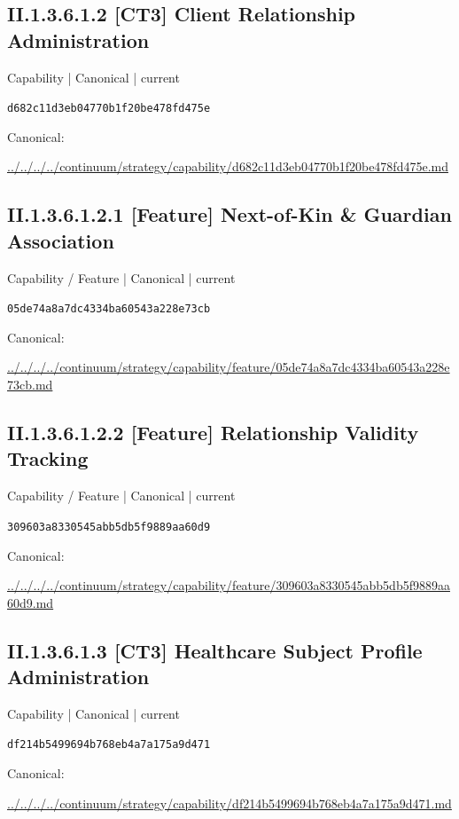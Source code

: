 \documentclass[10pt,a4paper]{article}
\begin{document}
\subsection*{II.1.3.6.1.2 [CT3] Client Relationship Administration}
{\small Capability | Canonical | current}\par
\texttt{d682c11d3eb04770b1f20be478fd475e}\par
Canonical: \par
{\footnotesize\url{../../../../continuum/strategy/capability/d682c11d3eb04770b1f20be478fd475e.md}}\par
\subsection*{II.1.3.6.1.2.1 [Feature] Next-of-Kin \& Guardian Association}
{\small Capability / Feature | Canonical | current}\par
\texttt{05de74a8a7dc4334ba60543a228e73cb}\par
Canonical: \par
{\footnotesize\url{../../../../continuum/strategy/capability/feature/05de74a8a7dc4334ba60543a228e73cb.md}}\par
\subsection*{II.1.3.6.1.2.2 [Feature] Relationship Validity Tracking}
{\small Capability / Feature | Canonical | current}\par
\texttt{309603a8330545abb5db5f9889aa60d9}\par
Canonical: \par
{\footnotesize\url{../../../../continuum/strategy/capability/feature/309603a8330545abb5db5f9889aa60d9.md}}\par
\subsection*{II.1.3.6.1.3 [CT3] Healthcare Subject Profile Administration}
{\small Capability | Canonical | current}\par
\texttt{df214b5499694b768eb4a7a175a9d471}\par
Canonical: \par
{\footnotesize\url{../../../../continuum/strategy/capability/df214b5499694b768eb4a7a175a9d471.md}}\par
\end{document}
